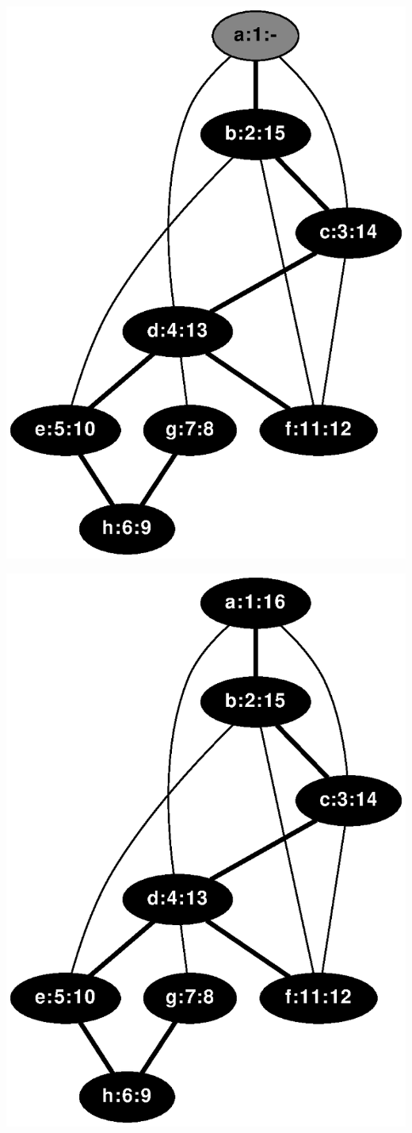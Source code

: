 \documentclass{article}
\begin{document}
\includegraphics[height=.3\textheight]{dfs_undirected_classroom_15.eps}
\vspace{1em}


\includegraphics[height=.3\textheight]{dfs_undirected_classroom_16.eps}
\end{document}
